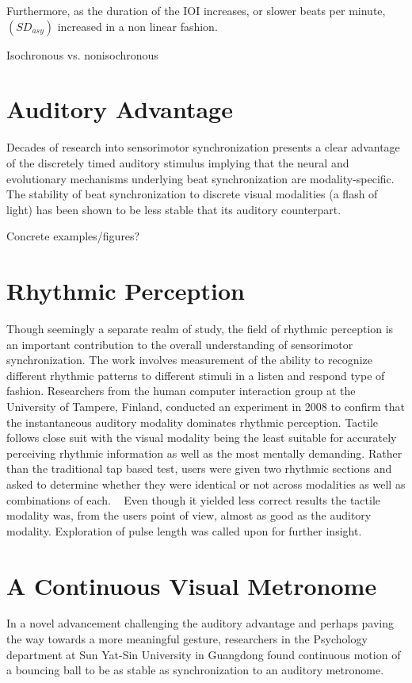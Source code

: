 Furthermore, as the duration of the IOI increases, or slower beats per minute, $(SD_{asy})$ increased in a non linear fashion. 

Isochronous vs. nonisochronous ~\cite{polak2016both}


\section{Auditory Advantage}
Decades of research into sensorimotor synchronization presents a clear advantage of the discretely timed auditory stimulus implying that the neural and evolutionary mechanisms underlying beat synchronization are modality-specific.
~\cite{gan2015synchronization} The stability of beat synchronization to discrete visual modalities (a flash of light) has been shown to be less stable that its auditory counterpart.

Concrete examples/figures?

\section{Rhythmic Perception}
Though seemingly a separate realm of study, the field of rhythmic perception is an important contribution to the overall understanding of sensorimotor synchronization. The work involves measurement of the ability to recognize different rhythmic patterns to different stimuli in a listen and respond type of fashion. Researchers from the human computer interaction group at the University of Tampere, Finland, conducted an experiment in 2008 to confirm that the instantaneous auditory modality dominates rhythmic perception. Tactile follows close suit with the visual modality being the least suitable for accurately perceiving rhythmic information as well as the most mentally demanding. Rather than the traditional tap based test, users were given two rhythmic sections and asked to determine whether they were identical or not across modalities as well as combinations of each. ~\cite{jokiniemi2008crossmodal} Even though it yielded less correct results the tactile modality was, from the users point of view, almost as good as the auditory modality. Exploration of pulse length was called upon for further insight.

\section{A Continuous Visual Metronome}
In a novel advancement challenging the auditory advantage and perhaps paving the way towards a more meaningful gesture, researchers in the Psychology department at Sun Yat-Sin University in Guangdong found continuous motion of a bouncing ball to be as stable as synchronization to an auditory metronome.
~\cite{gan2015synchronization}


